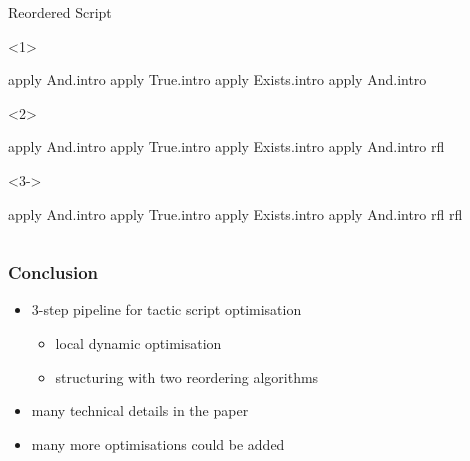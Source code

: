 \begin{frame}[fragile]
\begin{columns}[onlytextwidth,t]
    \begin{column}{.38\textwidth}
      \begin{block}{Reordered Script}
        \begin{onlyenv}<1>
          \begin{leancode}
            apply And.intro
            apply True.intro
            apply Exists.intro
            apply And.intro


          \end{leancode}
        \end{onlyenv}
        \begin{onlyenv}<2>
          \begin{leancode}[highlightlines=5]
            apply And.intro
            apply True.intro
            apply Exists.intro
            apply And.intro
            rfl

          \end{leancode}
        \end{onlyenv}
        \begin{onlyenv}<3->
          \begin{leancode}[highlightlines=6]
            apply And.intro
            apply True.intro
            apply Exists.intro
            apply And.intro
            rfl
            rfl
          \end{leancode}
        \end{onlyenv}
      \end{block}
    \end{column}
  \end{columns}
\end{frame}

\begin{frame}
  \frametitle{Conclusion}

  \begin{itemize}[<+->]
    \item 3-step pipeline for tactic script optimisation
          \begin{itemize}[<+->]
            \item local dynamic optimisation
            \item structuring with two reordering algorithms
          \end{itemize}
    \item many technical details in the paper
    \item many more optimisations could be added
  \end{itemize}
\end{frame}

